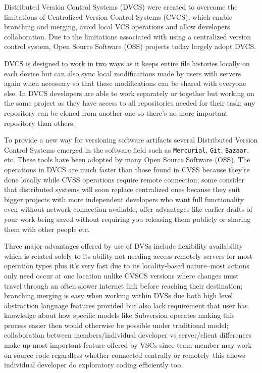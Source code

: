 Distributed Version Control Systems (DVCS) were created to overcome the limitations of Centralized Version Control Systems (CVCS), which enable branching and merging, avoid local VCS operations and allow developers collaboration. Due to the limitations associated with using a centralized version control system, Open Source Software (OSS) projects today largely adopt DVCS.

DVCS is designed to work in two ways as it keeps entire file histories locally on each device but can also sync local modifications made by users with servers again when necessary so that these modifications can be shared with everyone else. In DVCS developers are able to work separately or together but working on the same project as they have access to all repositories needed for their task; any repository can be cloned from another one so there's no more important repository than others.

To provide a new way for versioning software artifacts several Distributed Version Control Systems emerged in the software field such as \lstinline{Mercurial}, \lstinline{Git}, \lstinline{Bazaar}, etc. These tools have been adopted by many Open Source Software (OSS). The operations in DVCS are much faster than those found in CVSS because they're done locally while CVSS operations require remote connection; some consider that distributed systems will soon replace centralized ones because they suit bigger projects with more independent developers who want full functionality even without network connection available, offer advantages like earlier drafts of your work being saved without requiring you releasing them publicly or sharing them with other people etc.

Three major advantages offered by use of DVSs include flexibility availability which is related solely to its ability not needing access remotely servers for most operation types plus it's very fast due to its locality-based nature--most actions only need occur at one location unlike CVSCS versions where changes must travel through an often slower internet link before reaching their destination; branching merging is easy when working within DVSs due both high level abstraction language features provided but also lack requirement that user has knowledge about how specific models like Subversion operates making this process easier then would otherwise be possible under traditional model; collaboration between members/individual developer vs server/client differences make up most important feature offered by VSCs since team member may work on source code regardless whether connected centrally or remotely--this allows individual developer do exploratory coding efficiently too.

